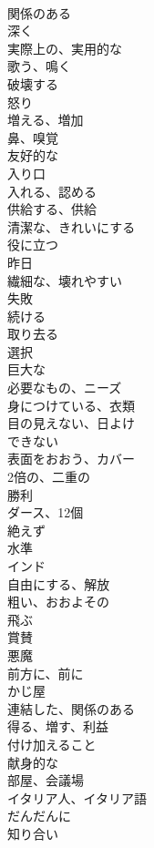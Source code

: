 \documentclass[8pt]{extreport}
\begin{document}
\begin{CJK}{UTF8}{min}
\\	関係のある	
\\	深く	
\\	実際上の、実用的な	
\\	歌う、鳴く	
\\	破壊する	
\\	怒り	
\\	増える、増加	
\\	鼻、嗅覚	
\\	友好的な	
\\	入り口	
\\	入れる、認める	
\\	供給する、供給	
\\	清潔な、きれいにする	
\\	役に立つ	
\\	昨日	
\\	繊細な、壊れやすい	
\\	失敗	
\\	続ける	
\\	取り去る	
\\	選択	
\\	巨大な	
\\	必要なもの、ニーズ	
\\	身につけている、衣類	
\\	目の見えない、日よけ	
\\	できない	
\\	表面をおおう、カバー	
\\	2倍の、二重の	
\\	勝利	
\\	ダース、12個	
\\	絶えず	
\\	水準	
\\	インド	
\\	自由にする、解放	
\\	粗い、おおよその	
\\	飛ぶ	
\\	賞賛	
\\	悪魔	
\\	前方に、前に	
\\	かじ屋	
\\	連結した、関係のある	
\\	得る、増す、利益	
\\	付け加えること	
\\	献身的な	
\\	部屋、会議場	
\\	イタリア人、イタリア語	
\\	だんだんに	
\\	知り合い	

\end{CJK}
\end{document}
